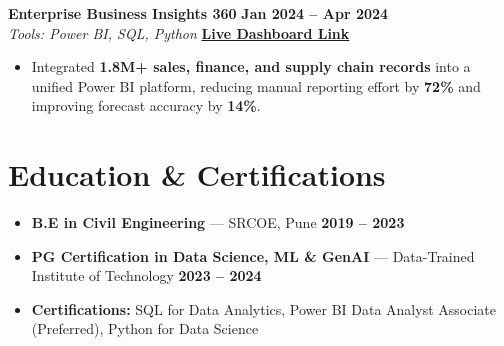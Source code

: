 \documentclass[a4paper,10pt]{article}
\begin{document}
\vspace{5pt}

\textbf{Enterprise Business Insights 360} \hfill \textbf{Jan 2024 -- Apr 2024} \\
\textit{Tools: Power BI, SQL, Python} \hfill \href{https://app.powerbi.com/view?r=eyJrIjoiZmMwNmJmYjUtMjUyYS00ZDg3LTgyMmYtMGRkYjgyYTZlMTIzIiwidCI6ImM2ZTU0OWIzLTVmNDUtNDAzMi1hYWU5LWQ0MjQ0ZGM1YjJjNCJ9}{\textbf{Live Dashboard Link}}
\begin{itemize}
    \item Integrated \textbf{1.8M+ sales, finance, and supply chain records} into a unified Power BI platform, reducing manual reporting effort by \textbf{72\%} and improving forecast accuracy by \textbf{14\%}.
\end{itemize}

\vspace{4pt}

\section{Education \& Certifications}
\begin{itemize}
    \item \textbf{B.E in Civil Engineering} --- SRCOE, Pune \hfill \textbf{2019 -- 2023}
    \item \textbf{PG Certification in Data Science, ML \& GenAI} --- Data-Trained Institute of Technology \hfill \textbf{2023 -- 2024}
    \item \textbf{Certifications:} SQL for Data Analytics, Power BI Data Analyst Associate (Preferred), Python for Data Science
\end{itemize}
\end{document}
